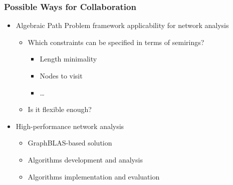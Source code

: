 \documentclass[xcolor=table,aspectratio=169]{beamer}
\begin{document}
\begin{frame}[fragile]
  \frametitle{Possible Ways for Collaboration}
    \begin{itemize}
      \item Algebraic Path Problem framework applicability for network analysis
      \begin{itemize}        
        \item Which constraints can be specified in terms of semirings?
        \begin{itemize}
          \item Length minimality
          \item Nodes to visit
          \item \ldots
        \end{itemize}
        \item Is it flexible enough?
      \end{itemize}
      \item High-performance network analysis
      \begin{itemize}        
        \item GraphBLAS-based solution
        \item Algorithms development and analysis
        \item Algorithms implementation and evaluation
      \end{itemize} 
    \end{itemize}
\end{frame}






\end{document}
